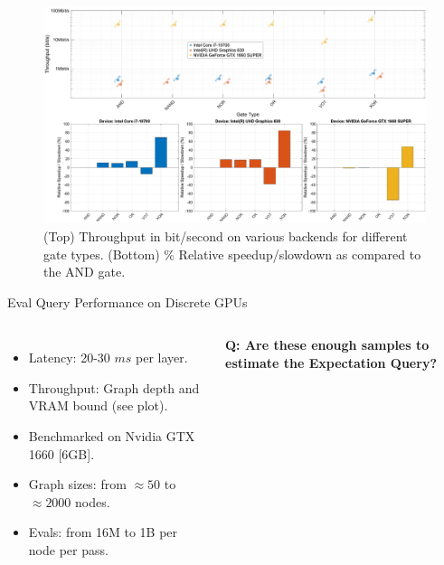 \begin{figure}[hb]
    \centering
    \includegraphics[height=0.8\textheight]{execution_model/slides_throughput_by_gate_type.eps}
    \caption{(Top) Throughput in bit/second on various backends for different gate types. (Bottom) \% Relative speedup/slowdown as compared to the AND gate.}
    \label{fig:gate_throughput}
\end{figure}

\begin{frame}{Eval Query Performance on Discrete GPUs}
  \begin{columns}
    {
      \begin{itemize}
          \item {Latency: 20-30 $ms$ per layer.}
          \item {Throughput: Graph depth and VRAM bound (see plot).}
          \item {Benchmarked on Nvidia GTX 1660 [6GB].}
          \item {Graph sizes: from $\approx 50$ to $\approx 2000$ nodes.}
          \item {Evals: from 16M to 1B per node per pass.}
      \end{itemize}
      \vspace{10pt}
      \textbf{Q: Are these enough samples to estimate the Expectation Query?}
    }
        \centering
        
  \end{columns}
\end{frame}